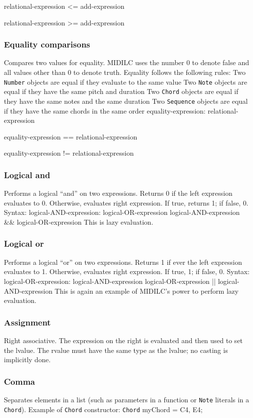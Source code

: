\documentclass[12pt,A4]{book}
\begin{document}
relational-expression <= add-expression

relational-expression >= add-expression
\subsubsection{Equality comparisons}
Compares two values for equality. MIDILC uses the number 0 to denote false and all values other than 0 to denote truth. Equality follows the following rules:
Two \verb|Number| objects are equal if they evaluate to the same value
Two \verb|Note| objects are equal if they have the same pitch and duration
Two \verb|Chord| objects are equal if they have the same notes and the same duration
Two \verb|Sequence| objects are equal if they have the same chords in the same order
equality-expression:    relational-expression

equality-expression == relational-expression

equality-expression != relational-expression
\subsubsection{Logical and}
Performs a logical “and” on two expressions. Returns 0 if the left expression evaluates to 0. Otherwise, evaluates right expression. If true, returns 1; if false, 0.
Syntax:
logical-AND-expression: logical-OR-expression
               logical-AND-expression && logical-OR-expression
This is lazy evaluation.
\subsubsection{Logical or}
Performs a logical “or” on two expressions. Returns 1 if ever the left expression evaluates to 1. Otherwise, evaluates right expression. If true, 1; if false, 0.
Syntax:
logical-OR-expression: logical-AND-expression
               logical-OR-expression || logical-AND-expression
This is again an example of MIDILC’s power to perform lazy evaluation.
\subsubsection{Assignment}
Right associative. The expression on the right is evaluated and then used to set the lvalue. The rvalue must have the same type as the lvalue; no casting is implicitly done.
\subsubsection{Comma}
Separates elements in a list (such as parameters in a function or \verb|Note| literals in a \verb|Chord|). Example of \verb|Chord| constructor:
\verb|Chord| myChord = {C4, E4};
\end{document}
